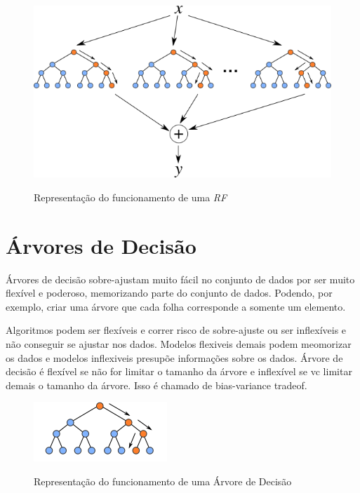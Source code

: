 \begin{figure}[h]
    \centering
    \includegraphics[scale=0.8]{monography/img/random_forest.png}
    \label{figure:rf}
    \caption[Representação do funcionamento de uma \textit{\acrshort{RF}}]{Representação do funcionamento de uma \textit{\acrshort{RF}}\footnotemark}
\end{figure}



\section{Árvores de Decisão}


Árvores de decisão sobre-ajustam muito fácil no conjunto de dados por ser muito flexível e poderoso, memorizando parte do conjunto de dados. Podendo, por exemplo, criar uma árvore que cada folha corresponde a somente um elemento.

 Algoritmos podem ser flexíveis e correr risco de sobre-ajuste ou ser inflexíveis e não conseguir se ajustar nos dados. Modelos flexiveis demais podem  meomorizar os dados e modelos inflexiveis presupõe informações sobre os dados.
 Árvore de decisão é flexível se não for limitar o tamanho da árvore e inflexível se vc limitar demais o tamanho da árvore. Isso é chamado de bias-variance tradeof.
 
 \begin{figure}[h]
    \centering
    \includegraphics[scale=1.5]{monography/img/decision_tree.png}
    \label{figure:rf}
    \caption[Representação do funcionamento de uma Árvore de Decisão]{Representação do funcionamento de uma Árvore de Decisão\footnotemark}
\end{figure}


